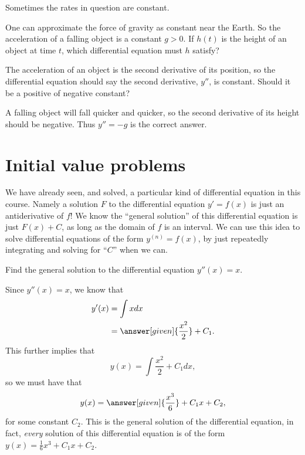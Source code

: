 \documentclass{ximera}
\begin{document}
Sometimes the rates in question are constant. 



\begin{question}
  One can approximate the force of gravity as constant near the Earth.
  So the acceleration of a falling object is a constant $g>0$.  If
  $h(t)$ is the height of an object at time $t$, which differential
  equation must $h$ satisfy?
  \begin{multipleChoice}
  \end{multipleChoice}
  
  \begin{hint}
    The acceleration of an object is the second derivative of its
    position, so the differential equation should say the second
    derivative, $y''$, is constant.  Should it be a positive of
    negative constant?
  \end{hint}
  \begin{hint}
    A falling object will fall quicker and quicker, so the second
    derivative of its height should be negative.  Thus $y''=-g$ is the
    correct answer.
  \end{hint}	
\end{question}

\section{Initial value problems}


We have already seen, and solved, a particular kind of differential
equation in this course.  Namely a solution $F$ to the differential
equation $y' = f(x)$ is just an antiderivative of $f$!  We know the
``general solution'' of this differential equation is just $F(x)+C$,
as long as the domain of $f$ is an interval.  We can use this idea to
solve differential equations of the form $y^{(n)} = f(x)$, by just
repeatedly integrating and solving for ``$C$'' when we can.

\begin{example}
  Find the general solution to the differential equation $y''(x) = x$.
  \begin{explanation}
    Since $y''(x) = x$, we know that
    \begin{align*}
      y'(x) &= \int x dx\\
      &= \answer[given]{\frac{x^2}{2}} + C_1.
    \end{align*}
    This further implies that
    \[
    y(x) = \int \frac{x^2}{2} + C_1 dx,
    \]
    so we must have that
    \[
    y(x) = \answer[given]{\frac{x^3}{6}}+C_1x+C_2,
    \]
    for some constant $C_2$.  This is the general solution of the
    differential equation, in fact, \textit{every} solution of this
    differential equation is of the form $y(x) =
    \frac{1}{6}x^3+C_1x+C_2$.
  \end{explanation}
\end{example}
\end{document}
